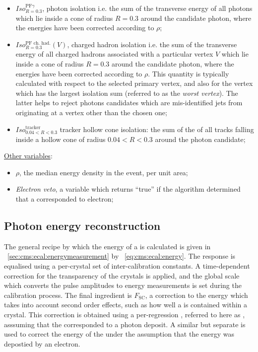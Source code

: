 \begin{itemize}
\item $Iso^{\textrm{PF}\gamma}_{R=0.3}$, \PF photon isolation i.e. the sum of the transverse energy of all \PF photons which lie inside a cone of radius $R=0.3$ around the candidate photon, where the energies have been corrected according to $\rho$;
\item $Iso^{\textrm{PF ch. had.}}_{R=0.3}(V)$, \PF charged hadron isolation i.e. the sum of the transverse energy of all \PF charged hadrons associated with a particular vertex $V$ which lie inside a cone of radius $R=0.3$ around the candidate photon, where the energies have been corrected according to $\rho$. This quantity is typically calculated with respect to the selected primary vertex, and also for the vertex which has the largest isolation sum (referred to as the \emph{worst vertex}). The latter helps to reject photons candidates which are mis-identified jets from originating at a vertex other than the chosen one;
\item $Iso^{\textrm{tracker}}_{0.04<R<0.3}$ tracker hollow cone isolation: the sum of the \pT of all tracks falling inside a hollow cone of radius $0.04 < R < 0.3$ around the photon candidate; 
\end{itemize}
\underline{Other variables}:
\begin{itemize}
\item $\rho$, the median energy density in the event, per unit area;
\item \emph{Electron veto}, a variable which returns ``true'' if the \PF algorithm determined that a \SC corresponded to electron;
\end{itemize}


\subsection{Photon energy reconstruction \BDT}
\label{sec:reco:photon:phoenergybdt}

The general recipe by which the energy of a \SC is calculated is given in \Sec~\ref{sec:cms:ecal:energymeasurement} by \Eq~\ref{eq:cms:ecal:energy}. The \ECAL response is equalised using a per-crystal set of inter-calibration constants. A time-dependent correction for the transparency of the crystals is applied, and the global scale which converts the pulse amplitudes to energy measurements is set during the calibration process. The final ingredient is $F_{\text{SC}}$, a correction to the \SC energy which takes into account second order effects, such as how well a \SC is contained within a crystal. This correction is obtained using a per-\SC regression \BDT, referred to here as \PhoEnergyBdt, asssuming that the \SC corresponded to a photon deposit. A similar but separate \BDT is used to correct the energy of the \SC under the assumption that the energy was depostied by an electron.

